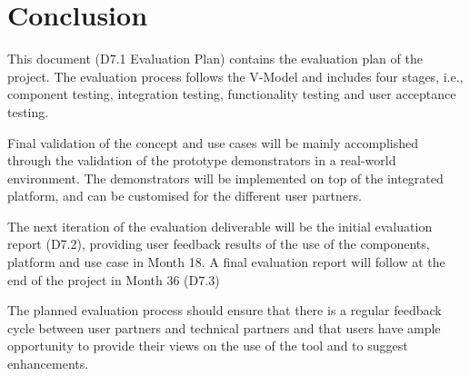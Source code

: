 \section{Conclusion}

This document (D7.1 Evaluation Plan) contains the evaluation plan of the \SUMMA project. The evaluation process follows the V-Model and includes four stages, i.e., component testing, integration testing, functionality testing and user acceptance testing.

Final validation of the \SUMMA concept and use cases will be mainly accomplished through the validation of the prototype demonstrators in a real-world environment. The demonstrators will be implemented on top of the integrated \SUMMA platform, and can be customised for the different user partners.

The next iteration of the evaluation deliverable will be the initial evaluation report (D7.2), providing user feedback results of the use of the components, platform and use case in Month 18. A final evaluation report will follow at the end of the project in Month 36 (D7.3)

The planned evaluation process should ensure that there is a regular feedback cycle between user partners and technical partners and that users have ample opportunity to provide their views on the use of the tool and to suggest enhancements. 
